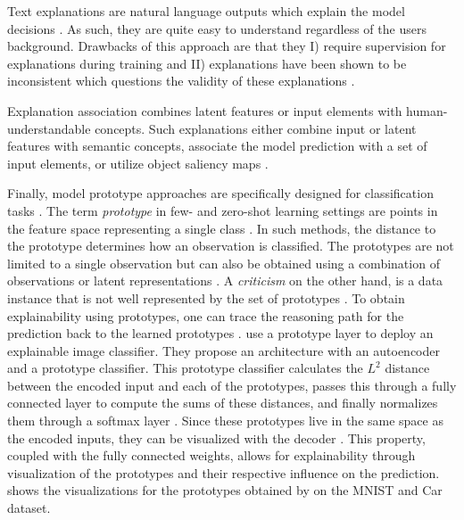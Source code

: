 Text explanations are natural language outputs which explain the model decisions \citep{xie2020explainable}. As such, they are quite easy to understand regardless of the users background. Drawbacks of this approach are that they I) require supervision for explanations during training and II) explanations have been shown to be inconsistent which questions the validity of these explanations \citep{CamburuSMLB20}. 

Explanation association combines latent features or input elements with human-understandable concepts. Such explanations either combine input or latent features with semantic concepts, associate the model prediction with a set of input elements, or utilize object saliency maps \citep{xie2020explainable}.

Finally, model prototype approaches are specifically designed for classification tasks \citep{Bien2011, KimRS14, PriebeMDS03, wu2017prototypal}. The term \emph{prototype} in few- and zero-shot learning settings are points in the feature space representing a single class \citep{LiLCR18}. In such methods, the distance to the prototype determines how an observation is classified. The prototypes are not limited to a single observation but can also be obtained using a combination of observations or latent representations \citep{xie2020explainable}. A \emph{criticism} on the other hand, is a data instance that is not well represented by the set of prototypes \citep{molnar2019}. To obtain explainability using prototypes, one can trace the reasoning path for the prediction back to the learned prototypes \citep{xie2020explainable}. \citet{LiLCR18} use a prototype layer to deploy an explainable image classifier. They propose an architecture with an autoencoder and a prototype classifier. This prototype classifier calculates the $L^2$ distance between the encoded input and each of the prototypes, passes this through a fully connected layer to compute the sums of these distances, and finally normalizes them through a softmax layer \citep{LiLCR18}. Since these prototypes live in the same space as the encoded inputs, they can be visualized with the decoder \citep{LiLCR18}. This property, coupled with the fully connected weights, allows for explainability through visualization of the prototypes and their respective influence on the prediction.  shows the visualizations for the prototypes obtained by \citet{LiLCR18} on the MNIST \citep{lecun-mnisthandwrittendigit-2010} and Car \citep{FidlerDU12} dataset.

